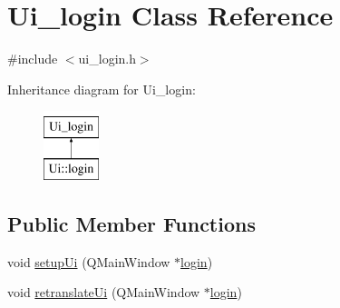 \hypertarget{classUi__login}{\section{Ui\-\_\-login Class Reference}
\label{classUi__login}
}


{\ttfamily \#include $<$ui\-\_\-login.\-h$>$}

Inheritance diagram for Ui\-\_\-login\-:\begin{figure}[H]
\begin{center}
\leavevmode
\includegraphics[height=2.000000cm]{classUi__login}
\end{center}
\end{figure}
\subsection*{Public Member Functions}
\begin{DoxyCompactItemize}
\item 
void \hyperlink{classUi__login_af480e20b471d5ec8be4cda04fa5c8b63}{setup\-Ui} (Q\-Main\-Window $\ast$\hyperlink{classlogin}{login})
\item 
void \hyperlink{classUi__login_a77a2fd196c2bad1275e6cc44af7a01b0}{retranslate\-Ui} (Q\-Main\-Window $\ast$\hyperlink{classlogin}{login})
\end{DoxyCompactItemize}
